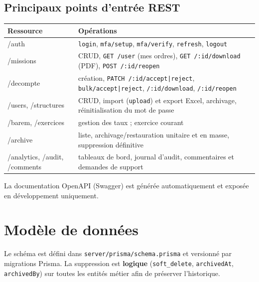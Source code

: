\documentclass[10.5pt,a4paper]{article}
\newcommand{\code}[1]{\texttt{\small #1}}
\begin{document}
\subsection{Principaux points d'entrée REST}
\begin{tabularx}{\textwidth}{@{}>{\ttfamily\small}l X@{}}
\toprule
\normalfont\bfseries Ressource & \bfseries Opérations \\
\midrule
/auth & \code{login}, \code{mfa/setup}, \code{mfa/verify}, \code{refresh}, \code{logout} \\
/missions & CRUD, \code{GET /user} (mes ordres), \code{GET /:id/download} (PDF), \code{POST /:id/reopen} \\
/decompte & création, \code{PATCH /:id/accept|reject}, \code{bulk/accept|reject}, \code{/:id/download}, \code{/:id/reopen} \\
/users, /structures & CRUD, import (\code{upload}) et export Excel, archivage, réinitialisation du mot de passe \\
/barem, /exercices & gestion des taux ; exercice courant \\
/archive & liste, archivage/restauration unitaire et en masse, suppression définitive \\
/analytics, /audit, /comments & tableaux de bord, journal d'audit, commentaires et demandes de support \\
\bottomrule
\end{tabularx}
La documentation OpenAPI (Swagger) est générée automatiquement et exposée en développement uniquement.

\section{Modèle de données}

Le schéma est défini dans \code{server/prisma/schema.prisma} et versionné par migrations Prisma.
La suppression est \textbf{logique} (\code{soft\_delete}, \code{archivedAt}, \code{archivedBy}) sur toutes les
entités métier afin de préserver l'historique.
\end{document}
